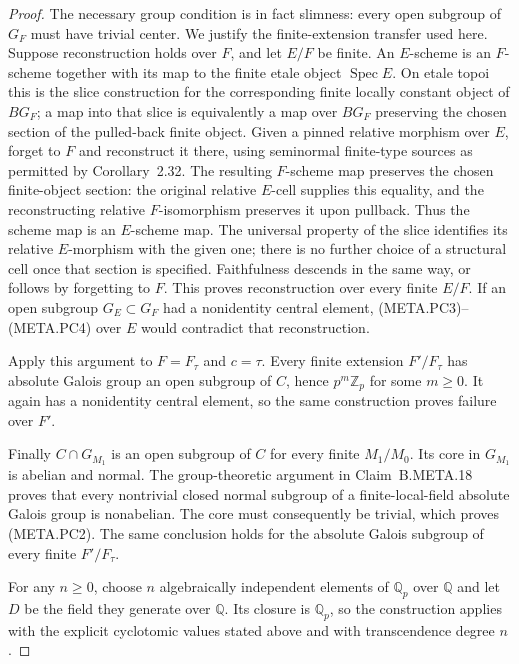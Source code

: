 \begin{proof}
The necessary group condition is in fact slimness:
every open subgroup of $G_F$ must have trivial center.
We justify the finite-extension transfer used here.
Suppose reconstruction holds over $F$, and let
$E/F$ be finite.
An $E$-scheme is an $F$-scheme together with its
map to the finite etale object $\operatorname{Spec}E$.
On etale topoi this is the slice construction for
the corresponding finite locally constant object
of $BG_F$; a map into that slice is equivalently
a map over $BG_F$ preserving the chosen section
of the pulled-back finite object.
Given a pinned relative morphism over $E$, forget
to $F$ and reconstruct it there, using seminormal
finite-type sources as permitted by Corollary~2.32.
The resulting $F$-scheme map preserves the chosen
finite-object section: the original relative
$E$-cell supplies this equality, and the
reconstructing relative $F$-isomorphism preserves
it upon pullback.
Thus the scheme map is an $E$-scheme map.
The universal property of the slice identifies
its relative $E$-morphism with the given one;
there is no further choice of a structural cell
once that section is specified.
Faithfulness descends in the same way, or follows
by forgetting to $F$.
This proves reconstruction over every finite $E/F$.
If an open subgroup $G_E\subset G_F$ had a
nonidentity central element, (META.PC3)--(META.PC4)
over $E$ would contradict that reconstruction.

Apply this argument to $F=F_\tau$ and $c=\tau$.
Every finite extension $F'/F_\tau$ has absolute
Galois group an open subgroup of $C$, hence
$p^m\mathbb Z_p$ for some $m\ge0$.
It again has a nonidentity central element,
so the same construction proves failure over $F'$.

Finally $C\cap G_{M_1}$ is an open subgroup of
$C$ for every finite $M_1/M_0$.
Its core in $G_{M_1}$ is abelian and normal.
The group-theoretic argument in Claim~B.META.18
proves that every nontrivial closed normal subgroup
of a finite-local-field absolute Galois group is
nonabelian.  The core must consequently be trivial,
which proves (META.PC2).
The same conclusion holds for the absolute Galois
subgroup of every finite $F'/F_\tau$.

For any $n\ge0$, choose $n$ algebraically independent
elements of $\mathbb Q_p$ over $\mathbb Q$ and let
$D$ be the field they generate over $\mathbb Q$.
Its closure is $\mathbb Q_p$, so the construction
applies with the explicit cyclotomic values stated
above and with transcendence degree $n$.
\end{proof}

